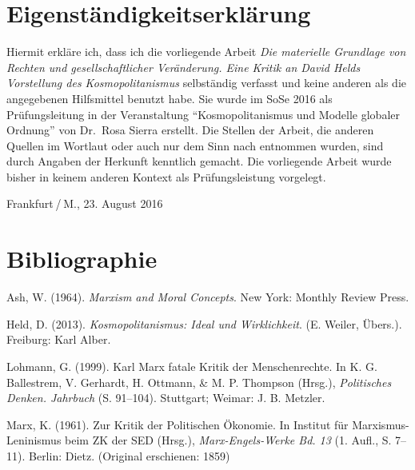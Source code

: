 \documentclass[ngerman,12pt, titlepage, smallheadings, nomath]{scrartcl}
\begin{document}
\newpage

\section*{Eigenständigkeitserklärung}\label{eigenstuxe4ndigkeitserkluxe4rung}

Hiermit erkläre ich, dass ich die vorliegende Arbeit \emph{Die
materielle Grundlage von Rechten und gesellschaftlicher Veränderung.
Eine Kritik an David Helds Vorstellung des Kosmopolitanismus}
selbständig verfasst und keine anderen als die angegebenen Hilfsmittel
benutzt habe. Sie wurde im SoSe 2016 als Prüfungsleitung in der
Veranstaltung \enquote{Kosmopolitanismus und Modelle globaler Ordnung}
von Dr.~Rosa Sierra erstellt. Die Stellen der Arbeit, die anderen
Quellen im Wortlaut oder auch nur dem Sinn nach entnommen wurden, sind
durch Angaben der Herkunft kenntlich gemacht. Die vorliegende Arbeit
wurde bisher in keinem anderen Kontext als Prüfungsleistung vorgelegt.
\vspace{3em}

\noindent Frankfurt / M., 23. August 2016

\newpage

\section*{Bibliographie}\label{bibliographie}

\vspace{-1em}

\indent
\vspace{-2em} \setlength{\parindent}{-0.2in}
\setlength{\leftskip}{0.2in} \setlength{\parskip}{8pt} \singlespacing

\hypertarget{refs}{}
\hypertarget{ref-ash1964}{}
Ash, W. (1964). \emph{Marxism and Moral Concepts}. New York: Monthly
Review Press.

\hypertarget{ref-held2013}{}
Held, D. (2013). \emph{Kosmopolitanismus: Ideal und Wirklichkeit}. (E.
Weiler, Übers.). Freiburg: Karl Alber.

\hypertarget{ref-lohmann1999}{}
Lohmann, G. (1999). Karl Marx fatale Kritik der Menschenrechte. In K. G.
Ballestrem, V. Gerhardt, H. Ottmann, \& M. P. Thompson (Hrsg.),
\emph{Politisches Denken. Jahrbuch} (S. 91--104). Stuttgart; Weimar: J.
B. Metzler.

\hypertarget{ref-marx1961}{}
Marx, K. (1961). Zur Kritik der Politischen Ökonomie. In Institut für
Marxismus-Leninismus beim ZK der SED (Hrsg.), \emph{Marx-Engels-Werke
Bd. 13} (1. Aufl., S. 7--11). Berlin: Dietz. (Original erschienen:
1859)
\end{document}
